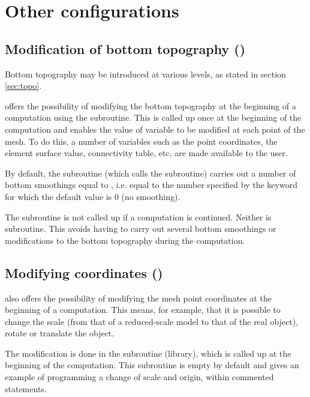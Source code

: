 \chapter{Other configurations}

\section{Modification of bottom topography ()}

Bottom topography may be introduced at various levels, as stated in section
\ref{sec:topo}.

 offers the possibility of modifying the bottom topography at the
beginning of a computation using the  subroutine. This is
called up once at the beginning of the computation and enables the value of
variable  to be modified at each point of the mesh. To do this, a number of
variables such as the point coordinates, the element surface value,
connectivity table, etc, are made available to the user.

By default, the  subroutine (which calls the
 subroutine) carries out a number of bottom
smoothings equal to , i.e. equal to the number specified by the keyword
 for which the default value is 0 (no
smoothing).

The  subroutine is not called up if a computation is continued.
Neither is  subroutine.
This avoids having to carry out several bottom smoothings or modifications to
the bottom topography during the computation.


\section{Modifying coordinates ()}

 also offers the possibility of modifying the mesh point coordinates
at the beginning of a computation. This means, for example, that it is possible
to change the scale (from that of a reduced-scale model to that of the real
object), rotate or translate the object.

The modification is done in the  subroutine (\bief library),
which is called up at the beginning of the computation. This subroutine is empty by
default and gives an example of programming a change of scale and origin,
within commented statements.

